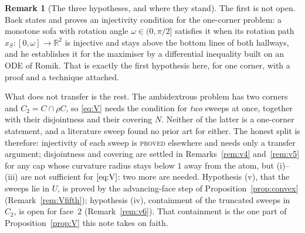 \documentclass[11pt]{article}
\theoremstyle{definition}
\newtheorem{remark}[theorem]{Remark}
\begin{document}
\begin{remark}[The three hypotheses, and where they stand]\label{rem:v3}
The first is not open. Baek \cite{Bae24} states and proves an injectivity condition for the
one-corner problem: a monotone sofa with rotation angle $\omega\in(0,\pi/2]$ satisfies it when
its rotation path $x_S:[0,\omega]\to\mathbb R^2$ is injective and stays above the bottom lines
of both hallways, and he establishes it for the maximiser by a differential inequality built
on an ODE of Romik. That is exactly the first hypothesis here, for one corner, with a proof
and a technique attached.

What does not transfer is the rest. The ambidextrous problem has two corners and
$C_2=C\cap\rho C$, so \eqref{eq:V} needs the condition for \emph{two} sweeps at once, together
with their disjointness and their covering $N$. Neither of the latter is a one-corner
statement, and a literature sweep found no prior art for either. The honest split is
therefore: injectivity of each sweep is \textsc{proved} elsewhere and needs only a transfer
argument; disjointness and covering are settled in Remarks~\ref{rem:v4} and~\ref{rem:v5} for
any cap whose curvature radius stays below $1$ away from the atom, but (i)--(iii)
are not sufficient for $\eqref{eq:V}$: two more are needed. Hypothesis (v), that the sweeps
lie in $U$, is proved by the advancing-face step of Proposition~\ref{prop:convex}
(Remark~\ref{rem:Vfifth}); hypothesis (iv), containment of the truncated sweeps in $C_2$, is
open for face~2 (Remark~\ref{rem:v6}). That containment is the one part of
Proposition~\ref{prop:V} this note takes on faith.
\end{remark}
\end{document}
